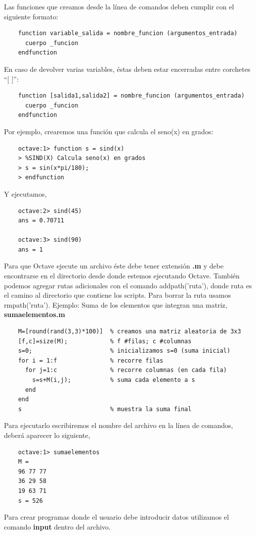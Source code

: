\documentclass[a4,12pt]{article}
\begin{document}
Las funciones que creamos desde la línea de comandos deben cumplir con el siguiente formato:
\begin{verbatim}
    function variable_salida = nombre_funcion (argumentos_entrada)
      cuerpo _funcion 
    endfunction
\end{verbatim}
En caso de devolver varias variables, éstas deben estar encerradas entre corchetes
“[ ]”:
\begin{verbatim}
    function [salida1,salida2] = nombre_funcion (argumentos_entrada)
      cuerpo _funcion 
    endfunction
\end{verbatim}
Por ejemplo, crearemos una función que calcula el seno(x) en grados:
\begin{verbatim}
    octave:1> function s = sind(x)
    > %SIND(X) Calcula seno(x) en grados
    > s = sin(x*pi/180);
    > endfunction
\end{verbatim}
Y ejecutamos,
\begin{verbatim}
    octave:2> sind(45)
    ans = 0.70711

    octave:3> sind(90)
    ans = 1
\end{verbatim}
Para que Octave ejecute un archivo éste debe tener extensión \textbf{.m} y debe encontrarse en el directorio desde donde estemos ejecutando Octave. También podemos agregar rutas adicionales con el comando  addpath('ruta'), donde ruta es el camino al directorio que contiene los scripts. Para borrar la ruta usamos rmpath('ruta').
Ejemplo: Suma de los elementos que integran una matriz, \textbf{sumaelementos.m}
\begin{verbatim}
    M=[round(rand(3,3)*100)]  % creamos una matriz aleatoria de 3x3
    [f,c]=size(M);            % f #filas; c #columnas
    s=0;                      % inicializamos s=0 (suma inicial)
    for i = 1:f               % recorre filas
      for j=1:c               % recorre columnas (en cada fila)
        s=s+M(i,j);           % suma cada elemento a s
      end
    end
    s                         % muestra la suma final
\end{verbatim}
Para ejecutarlo escribiremos el nombre del archivo en la línea de comandos, deberá aparecer lo siguiente,
\begin{verbatim}
    octave:1> sumaelementos
    M =
    96 77 77
    36 29 58
    19 63 71
    s = 526 
\end{verbatim}
Para crear programas donde el usuario  debe introducir datos utilizamos el comando \textbf{input} dentro del archivo.
\end{document}
